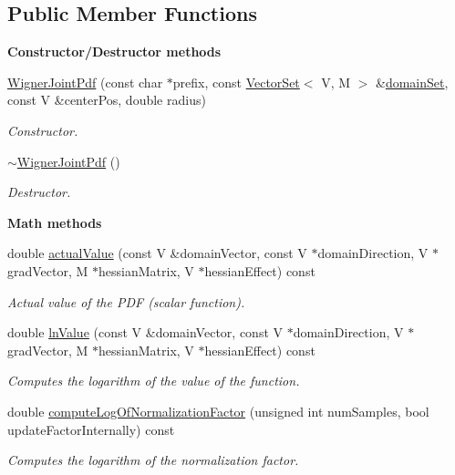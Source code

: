 \subsection*{Public Member Functions}
\begin{Indent}{\bf Constructor/\-Destructor methods}\par
\begin{DoxyCompactItemize}
\item 
\hyperlink{class_q_u_e_s_o_1_1_wigner_joint_pdf_a02a442c6808674aa589a872be23608f0}{Wigner\-Joint\-Pdf} (const char $\ast$prefix, const \hyperlink{class_q_u_e_s_o_1_1_vector_set}{Vector\-Set}$<$ V, M $>$ \&\hyperlink{class_q_u_e_s_o_1_1_base_scalar_function_ad0937628825249dd36ded3ce0c7959ac}{domain\-Set}, const V \&center\-Pos, double radius)
\begin{DoxyCompactList}\small\item\em Constructor. \end{DoxyCompactList}\item 
\hyperlink{class_q_u_e_s_o_1_1_wigner_joint_pdf_ad3f8b515620fe416cf9f4b9f0b83ccdb}{$\sim$\-Wigner\-Joint\-Pdf} ()
\begin{DoxyCompactList}\small\item\em Destructor. \end{DoxyCompactList}\end{DoxyCompactItemize}
\end{Indent}
\begin{Indent}{\bf Math methods}\par
\begin{DoxyCompactItemize}
\item 
double \hyperlink{class_q_u_e_s_o_1_1_wigner_joint_pdf_a48482e1e5b953cd0753bf0c39486a81f}{actual\-Value} (const V \&domain\-Vector, const V $\ast$domain\-Direction, V $\ast$grad\-Vector, M $\ast$hessian\-Matrix, V $\ast$hessian\-Effect) const 
\begin{DoxyCompactList}\small\item\em Actual value of the P\-D\-F (scalar function). \end{DoxyCompactList}\item 
double \hyperlink{class_q_u_e_s_o_1_1_wigner_joint_pdf_a64afe5e7a7974fc91b4394e81ba4da55}{ln\-Value} (const V \&domain\-Vector, const V $\ast$domain\-Direction, V $\ast$grad\-Vector, M $\ast$hessian\-Matrix, V $\ast$hessian\-Effect) const 
\begin{DoxyCompactList}\small\item\em Computes the logarithm of the value of the function. \end{DoxyCompactList}\item 
double \hyperlink{class_q_u_e_s_o_1_1_wigner_joint_pdf_adbe13f31b4bdfbf6eb9b7ad57f9e71f0}{compute\-Log\-Of\-Normalization\-Factor} (unsigned int num\-Samples, bool update\-Factor\-Internally) const 
\begin{DoxyCompactList}\small\item\em Computes the logarithm of the normalization factor. \end{DoxyCompactList}\end{DoxyCompactItemize}
\end{Indent}
